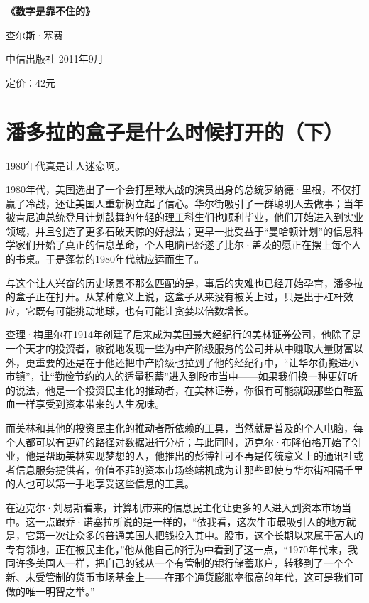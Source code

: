 \textbf{《数字是靠不住的》}

查尔斯·塞费

中信出版社 2011年9月

定价：42元

\hypertarget{ux6f58ux591aux62c9ux7684ux76d2ux5b50ux662fux4ec0ux4e48ux65f6ux5019ux6253ux5f00ux7684ux4e0b}{%
\section{潘多拉的盒子是什么时候打开的（下）}\label{ux6f58ux591aux62c9ux7684ux76d2ux5b50ux662fux4ec0ux4e48ux65f6ux5019ux6253ux5f00ux7684ux4e0b}}

1980年代真是让人迷恋啊。

1980年代，美国选出了一个会打星球大战的演员出身的总统罗纳德·里根，不仅打赢了冷战，还让美国人重新树立起了信心。华尔街吸引了一群聪明人去做事；当年被肯尼迪总统登月计划鼓舞的年轻的理工科生们也顺利毕业，他们开始进入到实业领域，并且创造了更多石破天惊的好想法；更早一批受益于``曼哈顿计划''的信息科学家们开始了真正的信息革命，个人电脑已经遂了比尔·盖茨的愿正在摆上每个人的书桌。于是蓬勃的1980年代就应运而生了。

与这个让人兴奋的历史场景不那么匹配的是，事后的灾难也已经开始孕育，潘多拉的盒子正在打开。从某种意义上说，这盒子从来没有被关上过，只是出于杠杆效应，它既有可能挑动地球，也有可能让贪婪以倍数增长。

查理·梅里尔在1914年创建了后来成为美国最大经纪行的美林证券公司，他除了是一个天才的投资者，敏锐地发现一些为中产阶级服务的公司并从中赚取大量财富以外，更重要的还是在于他还把中产阶级也拉到了他的经纪行中，``让华尔街搬进小市镇''，让``勤俭节约的人的适量积蓄''进入到股市当中------如果我们换一种更好听的说法，他是一个投资民主化的推动者，在美林证券，你很有可能就跟那些白鞋蓝血一样享受到资本带来的人生况味。

而美林和其他的投资民主化的推动者所依赖的工具，当然就是普及的个人电脑，每个人都可以有更好的路径对数据进行分析；与此同时，迈克尔·布隆伯格开始了创业，他是帮助美林实现梦想的人，他推出的彭博社可不再是传统意义上的通讯社或者信息服务提供者，价值不菲的资本市场终端机成为让那些即使与华尔街相隔千里的人也可以第一手地享受这些信息的工具。

在迈克尔·刘易斯看来，计算机带来的信息民主化让更多的人进入到资本市场当中。这一点跟乔·诺塞拉所说的是一样的，``依我看，这次牛市最吸引人的地方就是，它第一次让众多的普通美国人把钱投入其中。股市，这个长期以来属于富人的专有领地，正在被民主化，''他从他自己的行为中看到了这一点，``1970年代末，我同许多美国人一样，把自己的钱从一个有管制的银行储蓄账户，转移到了一个全新、未受管制的货币市场基金上------在那个通货膨胀率很高的年代，这可是我们可做的唯一明智之举。''


